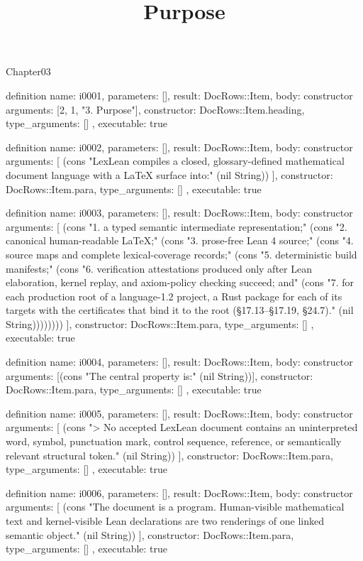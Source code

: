 \begin{lexlean}{Chapter03}
\title{Purpose}
\begin{semanticmodule}
definition{
  name: i0001,
  parameters: [],
  result: DocRows::Item,
  body: constructor{
    arguments: [2, 1, "3. Purpose"],
    constructor: DocRows::Item.heading,
    type_arguments: []
  },
  executable: true
}

definition{
  name: i0002,
  parameters: [],
  result: DocRows::Item,
  body: constructor{
    arguments: [
      (cons "LexLean compiles a closed, glossary-defined mathematical document language with a LaTeX surface into:" (nil String))
    ],
    constructor: DocRows::Item.para,
    type_arguments: []
  },
  executable: true
}

definition{
  name: i0003,
  parameters: [],
  result: DocRows::Item,
  body: constructor{
    arguments: [
      (cons "1. a typed semantic intermediate representation;" (cons "2. canonical human-readable LaTeX;" (cons "3. prose-free Lean 4 source;" (cons "4. source maps and complete lexical-coverage records;" (cons "5. deterministic build manifests;" (cons "6. verification attestations produced only after Lean elaboration, kernel replay, and axiom-policy checking succeed; and" (cons "7. for each production root of a language-1.2 project, a Rust package for each of its targets with the certificates that bind it to the root (§17.13–§17.19, §24.7)." (nil String))))))))
    ],
    constructor: DocRows::Item.para,
    type_arguments: []
  },
  executable: true
}

definition{
  name: i0004,
  parameters: [],
  result: DocRows::Item,
  body: constructor{
    arguments: [(cons "The central property is:" (nil String))],
    constructor: DocRows::Item.para,
    type_arguments: []
  },
  executable: true
}

definition{
  name: i0005,
  parameters: [],
  result: DocRows::Item,
  body: constructor{
    arguments: [
      (cons "> No accepted LexLean document contains an uninterpreted word, symbol, punctuation mark, control sequence, reference, or semantically relevant structural token." (nil String))
    ],
    constructor: DocRows::Item.para,
    type_arguments: []
  },
  executable: true
}

definition{
  name: i0006,
  parameters: [],
  result: DocRows::Item,
  body: constructor{
    arguments: [
      (cons "The document is a program. Human-visible mathematical text and kernel-visible Lean declarations are two renderings of one linked semantic object." (nil String))
    ],
    constructor: DocRows::Item.para,
    type_arguments: []
  },
  executable: true
}


\end{semanticmodule}
\end{lexlean}

